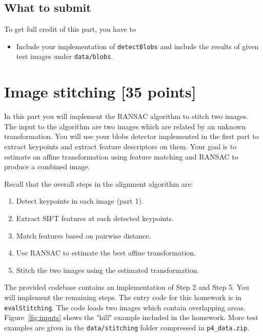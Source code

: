 \documentclass[10pt,letterpaper]{article}
\newcommand{\cmd}[1] {{\color{blue}\texttt{#1}}}
\begin{document}
\subsection{What to submit}
To get full credit of this part, you have to
\begin{itemize}
\item Include your implementation of \cmd{detectBlobs} and include the results of given test images under \texttt{data/blobs}.
\end{itemize}


\section{Image stitching [35 points]}

In this part you will implement the RANSAC algorithm to stitch two images. The input to the algorithm are two images which are related by an unknown transformation. You will use your blobs detector implemented in the first part to extract keypoints and extract feature descriptors on them.  Your goal is to estimate an affine transformation using feature matching and RANSAC to produce a combined image. 


Recall that the overall steps in the alignment algorithm are:
\begin{enumerate}
\item Detect keypoints in each image (part 1).
\item Extract SIFT features at each detected keypoints.
\item Match features based on pairwise distance.
\item Use RANSAC to estimate the best affine transformation.
\item Stitch the two images using the estimated transformation.
\end{enumerate}

The provided codebase contains an implementation of Step 2 and Step 5. You will implement the remaining steps. The entry code for this homework is in \cmd{evalStitching}.  The code loads two images which contain overlapping areas. Figure~\ref{fig:inputs} shows the "hill" example included in the homework. More test examples are given in the \cmd{data/stitching} folder compressed in \cmd{p4\_data.zip}.
\end{document}
